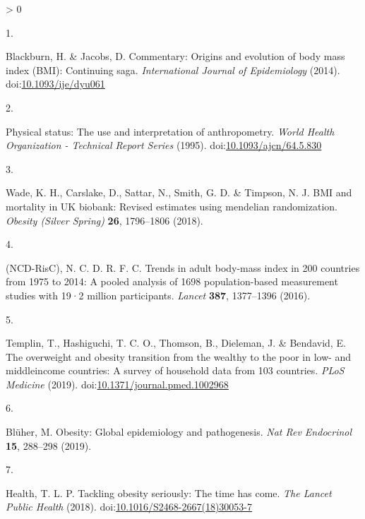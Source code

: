 \documentclass[11pt,twoside]{bristolthesis}
\newlength{\cslhangindent}
\newlength{\csllabelwidth}
\newenvironment{CSLReferences}[2] %
 {%
  \setlength{\parindent}{0pt}
  \ifodd #1 \everypar{\setlength{\hangindent}{\cslhangindent}}\ignorespaces\fi
  \ifnum #2 > 0
  \setlength{\parskip}{#2\baselineskip}
  \fi
 }%
 {}
\newcommand{\CSLLeftMargin}[1]{\parbox[t]{\csllabelwidth}{#1}}
\newcommand{\CSLRightInline}[1]{\parbox[t]{\linewidth - \csllabelwidth}{#1}\break}
\begin{document}
\noindent

\setlength{\parindent}{-0.20in}
\setlength{\leftskip}{0.20in}
\setlength{\parskip}{8pt}

\hypertarget{refs}{}
\begin{CSLReferences}{0}{0}
\leavevmode\hypertarget{ref-Blackburn2014}{}%
\CSLLeftMargin{1. }
\CSLRightInline{Blackburn, H. \& Jacobs, D. Commentary: Origins and evolution of body mass index (BMI): Continuing saga. \emph{International Journal of Epidemiology} (2014). doi:\href{https://doi.org/10.1093/ije/dyu061}{10.1093/ije/dyu061}}

\leavevmode\hypertarget{ref-WHO1995}{}%
\CSLLeftMargin{2. }
\CSLRightInline{Physical status: The use and interpretation of anthropometry. \emph{World Health Organization - Technical Report Series} (1995). doi:\href{https://doi.org/10.1093/ajcn/64.5.830}{10.1093/ajcn/64.5.830}}

\leavevmode\hypertarget{ref-Wade2018}{}%
\CSLLeftMargin{3. }
\CSLRightInline{Wade, K. H., Carslake, D., Sattar, N., Smith, G. D. \& Timpson, N. J. BMI and mortality in UK biobank: Revised estimates using mendelian randomization. \emph{Obesity (Silver Spring)} \textbf{26}, 1796--1806 (2018).}

\leavevmode\hypertarget{ref-NCD-RisC2016}{}%
\CSLLeftMargin{4. }
\CSLRightInline{(NCD-RisC), N. C. D. R. F. C. Trends in adult body-mass index in 200 countries from 1975 to 2014: A pooled analysis of 1698 population-based measurement studies with 19·2 million participants. \emph{Lancet} \textbf{387}, 1377--1396 (2016).}

\leavevmode\hypertarget{ref-Templin2019}{}%
\CSLLeftMargin{5. }
\CSLRightInline{Templin, T., Hashiguchi, T. C. O., Thomson, B., Dieleman, J. \& Bendavid, E. The overweight and obesity transition from the wealthy to the poor in low- and middleincome countries: A survey of household data from 103 countries. \emph{PLoS Medicine} (2019). doi:\href{https://doi.org/10.1371/journal.pmed.1002968}{10.1371/journal.pmed.1002968}}

\leavevmode\hypertarget{ref-Bluher2019}{}%
\CSLLeftMargin{6. }
\CSLRightInline{Blüher, M. Obesity: Global epidemiology and pathogenesis. \emph{Nat Rev Endocrinol} \textbf{15}, 288--298 (2019).}

\leavevmode\hypertarget{ref-TheLancetPublicHealth2018}{}%
\CSLLeftMargin{7. }
\CSLRightInline{Health, T. L. P. Tackling obesity seriously: The time has come. \emph{The Lancet Public Health} (2018). doi:\href{https://doi.org/10.1016/S2468-2667(18)30053-7}{10.1016/S2468-2667(18)30053-7}}


\end{CSLReferences}
\end{document}
